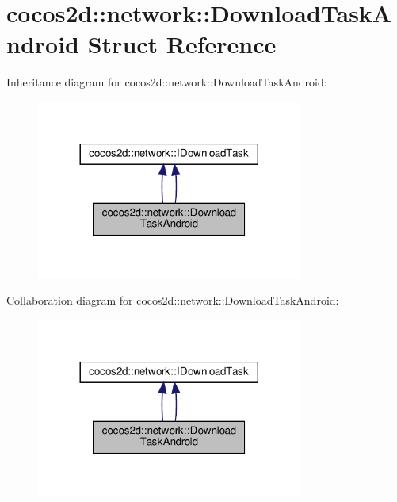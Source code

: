 \hypertarget{structcocos2d_1_1network_1_1DownloadTaskAndroid}{}\section{cocos2d\+:\+:network\+:\+:Download\+Task\+Android Struct Reference}
\label{structcocos2d_1_1network_1_1DownloadTaskAndroid}


Inheritance diagram for cocos2d\+:\+:network\+:\+:Download\+Task\+Android\+:
\nopagebreak
\begin{figure}[H]
\begin{center}
\leavevmode
\includegraphics[width=248pt]{structcocos2d_1_1network_1_1DownloadTaskAndroid__inherit__graph}
\end{center}
\end{figure}


Collaboration diagram for cocos2d\+:\+:network\+:\+:Download\+Task\+Android\+:
\nopagebreak
\begin{figure}[H]
\begin{center}
\leavevmode
\includegraphics[width=248pt]{structcocos2d_1_1network_1_1DownloadTaskAndroid__coll__graph}
\end{center}
\end{figure}
